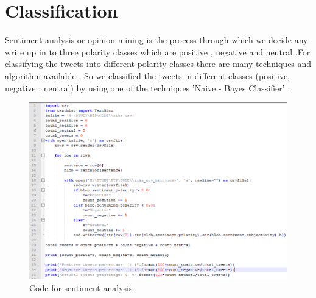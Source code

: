 \section{Classification}
Sentiment analysis or opinion mining is the process through which we decide any write up in to three polarity classes which are positive , negative and neutral .For classifying the tweets into different polarity  classes there are many techniques and algorithm available  . So we classified the tweets in different classes (positive, negative , neutral)  by using one of the techniques 'Naive - Bayes Classifier' .
\begin{figure}[h]
\centerline{\includegraphics[width=5.7in]{sac}}
\caption{Code for sentiment analysis}
\end{figure}

